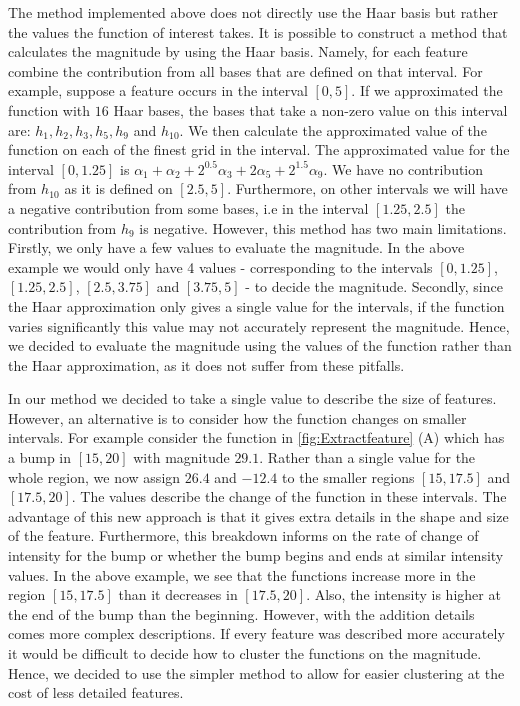 \documentclass[../main.tex]{subfiles}
\begin{document}
The method implemented above does not directly use the Haar basis but rather the values the function of interest takes. It is possible to construct a method that calculates the magnitude by using the Haar basis. Namely, for each feature combine the contribution from all bases that are defined on that interval. For example, suppose a feature occurs in the interval $[0,5]$. If we approximated the function with $16$ Haar bases, the bases that take a non-zero value on this interval are: $h_1,h_2,h_3,h_5,h_9$ and $h_{10}$. We then calculate the approximated value of the function on each of the finest grid in the interval. The approximated value for the interval $[0,1.25]$ is $\alpha_1 + \alpha_2 + 2^{0.5}\alpha_3  + 2\alpha_5  + 2^{1.5}\alpha_9$. We have no contribution from $h_{10}$ as it is defined on $[2.5,5]$. Furthermore, on other intervals we will have a negative contribution from some bases, i.e in the interval $[1.25,2.5]$ the contribution from $h_9$ is negative. However, this method has two main limitations. Firstly, we only have a few values to evaluate the magnitude. In the above example we would only have 4 values - corresponding to the intervals $[0,1.25]$, $[1.25,2.5]$, $[2.5,3.75]$ and $[3.75,5]$ - to decide the magnitude. Secondly, since the Haar approximation only gives a single value for the intervals, if the function varies significantly this value may not accurately represent the magnitude. Hence, we decided to evaluate the magnitude using the values of the function rather than the Haar approximation, as it does not suffer from these pitfalls. 

In our method we decided to take a single value to describe the size of features. However, an alternative is to consider how the function changes on smaller intervals. For example consider the function in \ref{fig:Extractfeature} (A) which has a bump in $[15,20]$ with magnitude $29.1$. Rather than a single value for the whole region, we now assign $26.4$ and $-12.4$ to the smaller regions $[15,17.5]$ and $[17.5,20]$. The values describe the change of the function in these intervals. The advantage of this new approach is that it gives extra details in the shape and size of the feature. Furthermore, this breakdown informs on the rate of change of intensity for the bump or whether the bump begins and ends at similar intensity values. In the above example, we see that the functions increase more in the region $[15,17.5]$ than it decreases in $[17.5,20]$. Also, the intensity is higher at the end of the bump than the beginning. However, with the addition details comes more complex descriptions. If every feature was described more accurately it would be difficult to decide how to cluster the functions on the magnitude.  Hence, we decided to use the simpler method to allow for easier clustering at the cost of less detailed features.
 
\end{document}
